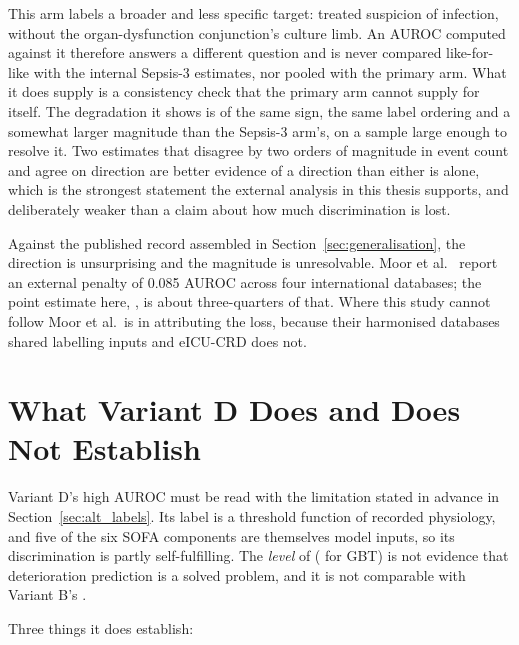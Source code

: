 This arm labels a broader and less specific target: treated suspicion of
infection, without the organ-dysfunction conjunction's culture limb. An AUROC
computed against it therefore answers a different question and is never
compared like-for-like with the internal Sepsis-3 estimates, nor pooled with the
primary arm. What it does supply is a consistency check that the primary arm
cannot supply for itself. The degradation it shows is of the same sign, the same
label ordering and a somewhat larger magnitude than the Sepsis-3 arm's, on a
sample large enough to resolve it. Two estimates that disagree by two orders of
magnitude in event count and agree on direction are better evidence of a
direction than either is alone, which is the strongest statement the external
analysis in this thesis supports, and deliberately weaker than a claim about how
much discrimination is lost.

Against the published record assembled in Section~\ref{sec:generalisation},
the direction is unsurprising and the magnitude is unresolvable. Moor et al.\
\cite{moor2023review} report an external penalty of 0.085 AUROC across four
international databases; the point estimate here, \pcHFiveEst, is about
three-quarters of that. Where this study cannot follow Moor et al.\ is in
attributing the loss, because their harmonised databases shared labelling
inputs and eICU-CRD does not.


\section{What Variant D Does and Does Not Establish}
\label{sec:variant_d_establishes}

Variant D's high AUROC must be read with the limitation stated in advance in
Section~\ref{sec:alt_labels}. Its label is a threshold function of recorded
physiology, and five of the six SOFA components are themselves model inputs, so
its discrimination is partly self-fulfilling. The \emph{level} of
\pcAltAurocFullPrimaryD{} (\pcAltAurocFullGbtD{} for GBT) is not evidence that
deterioration prediction is a solved problem, and it is not comparable with
Variant B's \pcAurocPrimaryB.

Three things it does establish:

